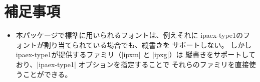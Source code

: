 \documentclass[a4paper]{ltjsarticle}
\newcommand{\Pkg}[1]{\textsf{#1}}
\begin{document}
\section{補足事項}
\label{sec:remarks}

\begin{itemize}
\item 本パッケージで標準に用いられるフォントは、例えそれに
  ipaex-type1のフォントが割り当てられている場合でも、縦書きを
  サポートしない。
  しかし\Pkg{ipaex-type1}が提供するファミリ（|ipxm| と |ipxg|）は
  縦書きをサポートしており、|ipaex-type1| オプションを指定することで
  それらのファミリを直接使うことができる。
\end{itemize}

\end{document}
